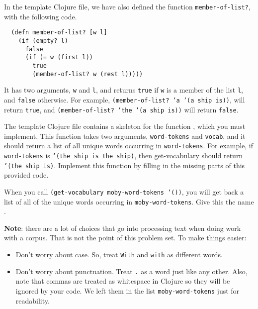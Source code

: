 \documentclass[10pt]{article}
\newcommand{\required}[1]{{\color{blue}{#1}}}
\begin{document}
In the template Clojure file, we have also defined the function
\texttt{member-of-list?}, with the following code.
\begin{lstlisting}
  (defn member-of-list? [w l]
    (if (empty? l)
      false
      (if (= w (first l))
        true
        (member-of-list? w (rest l)))))
\end{lstlisting}
It has two arguments, \texttt{w} and \texttt{l}, and returns \texttt{true} if
\texttt{w} is a member of the list \texttt{l}, and \texttt{false} otherwise. For
example, \texttt{(member-of-list? 'a '(a ship is))}, will return
\texttt{true}, and \texttt{(member-of-list? 'the '(a ship is))} will return
\texttt{false}.

The template Clojure file contains a skeleton for the function
\required{\texttt{get-vocabulary}}, which you must implement. This function
takes two arguments, \texttt{word-tokens} and \texttt{vocab}, and it should
return a list of all unique words occurring in \texttt{word-tokens}. For
example, if \texttt{word-tokens} is \texttt{'(the ship is the ship)}, then
get-vocabulary should return \texttt{'(the ship is)}. Implement this function by
filling in the missing parts of this provided code.

When you call \texttt{(get-vocabulary moby-word-tokens '())}, you will get back
a list of all of the unique words occurring in \texttt{moby-word-tokens}. Give
this the name \required{\texttt{moby-vocab}}.


\textbf{Note}: there are a lot of choices that go into processing text when
doing work with a corpus. That is not the point of this problem set.  To make
things easier:
\begin{itemize}[nosep]
  \item Don't worry about case.   So, treat \texttt{With} and \texttt{with} as
    different words.
  \item Don't worry about punctuation.  Treat \texttt{.} as a word just like any
    other. Also, note that commas are treated as whitespace in Clojure so they
    will be ignored by your code. We left them in the list
    \texttt{moby-word-tokens} just for readability.
\end{itemize}
\end{document}
